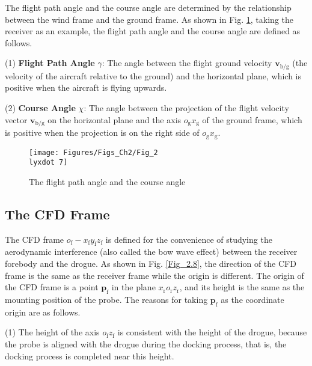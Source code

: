 The flight path angle and the course angle are determined by the relationship
between the wind frame and the ground frame. As shown in Fig. \ref{Fig_2.7},
taking the receiver as an example, the flight path angle and the course angle are defined
as follows.

(1) \textbf{Flight Path Angle} $\gamma$: The angle between the flight
ground velocity ${{\mathbf{v}}_{\text{b/g}}}$ (the velocity of the
aircraft relative to the ground) and the horizontal plane, which is
positive when the aircraft is flying upwards.

(2) \textbf{Course Angle} $\chi$: The angle between the projection
of the flight velocity vector ${{\mathbf{v}}_{\text{{b}/{g}}}}$ on
the horizontal plane and the axis ${{o}_{\text{g}}}{{x}_{\text{g}}}$
of the ground frame, which is positive when the projection is on the
right side of ${{o}_{\text{g}}}{{x}_{\text{g}}}$.

\begin{figure}
	\begin{centering}
		\texttt{[image: Figures/Figs\_Ch2/Fig\_2\\lyxdot 7]}
		\par\end{centering}
	\caption{The flight path angle and the course angle}
	
	\centering{}\label{Fig_2.7}
\end{figure}


\subsection{The CFD Frame}

The CFD frame ${{o}_{\text{f}}}-{{x}_{\text{f}}}{{y}_{\text{f}}}{{z}_{\text{f}}}$
is defined for the convenience of studying the aerodynamic interference
(also called the bow wave effect) between the receiver forebody and
the drogue. As shown in Fig. \ref{Fig_2.8}, the direction of the
CFD frame is the same as the receiver frame while the origin is different.
The origin of the CFD frame is a point ${{\mathbf{p}}_{\text{f}}}$
in the plane ${{x}_{\text{r}}}{{o}_{\text{r}}}{{z}_{\text{r}}}$,
and its height is the same as the mounting position of the probe.
The reasons for taking ${{\mathbf{p}}_{\text{f}}}$ as the coordinate
origin are as follows. 

(1) The height of the axis ${{o}_{\text{f}}}{{z}_{\text{f}}}$ is
consistent with the height of the drogue, because the probe is aligned
with the drogue during the docking process, that is, the docking process
is completed near this height. 

